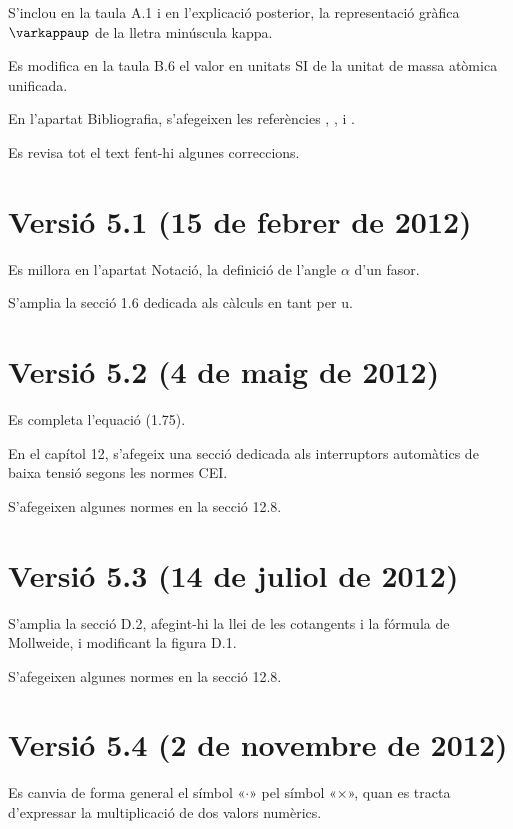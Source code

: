 S'inclou en la taula A.1 i en l'explicació posterior, la representació gràfica $\varkappaup$ de la lletra minúscula kappa.

Es modifica en la taula B.6 el valor en unitats SI de la unitat de massa atòmica unificada.

En l'apartat Bibliografia, s'afegeixen les referències \cite{GRZ}, \cite{DUN}, \cite{REI} i \cite{TLE}.

Es revisa tot el text fent-hi algunes correccions.

\section*{Versió 5.1 (15 de febrer de 2012)}

Es millora en l'apartat Notació, la definició de l'angle $\alpha$ d'un fasor.

S'amplia la secció 1.6 dedicada als càlculs en tant per u.


\section*{Versió 5.2 (4 de maig de 2012)}

Es completa l'equació (1.75).

En el capítol 12, s'afegeix una secció dedicada als interruptors automàtics de baixa tensió segons les normes CEI.

S'afegeixen algunes normes en la secció 12.8.

\section*{Versió 5.3 (14 de juliol de 2012)}

S'amplia la secció D.2, afegint-hi la llei de les cotangents i la fórmula de Mollweide, i modificant  la figura D.1.

S'afegeixen algunes normes en la secció 12.8.

\section*{Versió 5.4 (2 de novembre de 2012)}

Es canvia de forma general el símbol «$\cdot$» pel símbol «$\times$», quan es tracta d'expressar la multiplicació de dos valors numèrics.

